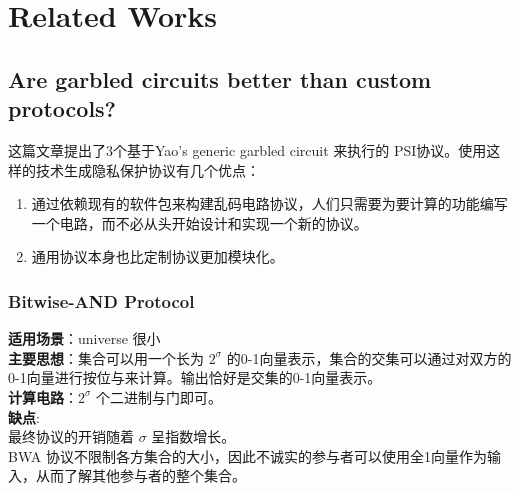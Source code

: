  \section{Related Works}
\subsection{ Are garbled circuits better than custom protocols?\cite{huang2012private} }
\noindent 这篇文章\cite{huang2012private}提出了3个基于Yao’s generic garbled circuit 来执行的 PSI协议。使用这样的技术生成隐私保护协议有几个优点：
\begin{enumerate}
\item 通过依赖现有的软件包来构建乱码电路协议，人们只需要为要计算的功能编写一个电路，而不必从头开始设计和实现一个新的协议。
\item 通用协议本身也比定制协议更加模块化。
\end{enumerate}
\subsubsection{Bitwise-AND Protocol}
\noindent \textbf{适用场景}：universe 很小\\
\textbf{主要思想}：集合可以用一个长为 $2^\sigma$ 的0-1向量表示，集合的交集可以通过对双方的0-1向量进行按位与来计算。输出恰好是交集的0-1向量表示。\\
\textbf{计算电路}：$2^\sigma$ 个二进制与门即可。\\
\textbf{缺点}:\\
最终协议的开销随着 $\sigma$ 呈指数增长。\\
BWA 协议不限制各方集合的大小，因此不诚实的参与者可以使用全1向量作为输入，从而了解其他参与者的整个集合。
